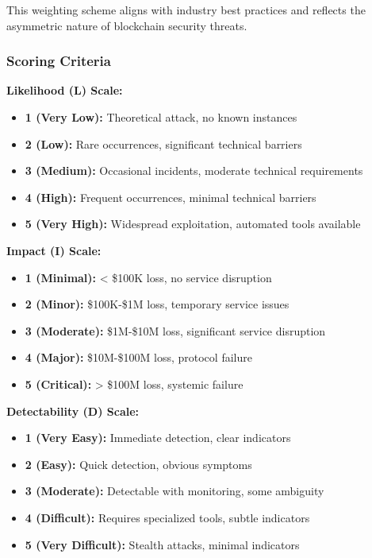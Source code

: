 This weighting scheme aligns with industry best practices and reflects the asymmetric nature of blockchain security threats.

\subsubsection{Scoring Criteria}
\textbf{Likelihood (L) Scale:}
\begin{itemize}
    \item \textbf{1 (Very Low):} Theoretical attack, no known instances
    \item \textbf{2 (Low):} Rare occurrences, significant technical barriers
    \item \textbf{3 (Medium):} Occasional incidents, moderate technical requirements
    \item \textbf{4 (High):} Frequent occurrences, minimal technical barriers
    \item \textbf{5 (Very High):} Widespread exploitation, automated tools available
\end{itemize}

\textbf{Impact (I) Scale:}
\begin{itemize}
    \item \textbf{1 (Minimal):} < \$100K loss, no service disruption
    \item \textbf{2 (Minor):} \$100K-\$1M loss, temporary service issues
    \item \textbf{3 (Moderate):} \$1M-\$10M loss, significant service disruption
    \item \textbf{4 (Major):} \$10M-\$100M loss, protocol failure
    \item \textbf{5 (Critical):} > \$100M loss, systemic failure
\end{itemize}

\textbf{Detectability (D) Scale:}
\begin{itemize}
    \item \textbf{1 (Very Easy):} Immediate detection, clear indicators
    \item \textbf{2 (Easy):} Quick detection, obvious symptoms
    \item \textbf{3 (Moderate):} Detectable with monitoring, some ambiguity
    \item \textbf{4 (Difficult):} Requires specialized tools, subtle indicators
    \item \textbf{5 (Very Difficult):} Stealth attacks, minimal indicators
\end{itemize}

